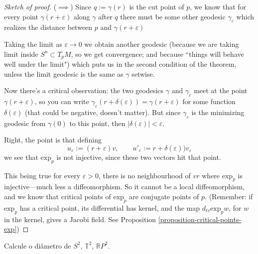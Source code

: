 \begin{proof}[Sketch of proof]
($\implies$) Since $q:=\gamma(r)$ is the cut point of $p$, we know that for every point
$\gamma(r+\varepsilon)$ along $\gamma$ after $q$ there must be some other geodesic
$\gamma_\varepsilon$ which realizes the distance between $p$ and
$\gamma(r+\varepsilon)$

Taking the limit as $\varepsilon \to 0$ we obtain another geodesic
(because we are taking limit inside $S^n \subset T_pM$, so we get convergence;
and because ``things will behave well under the limit")
which puts us in the second condition of the theorem,
unless the limit geodesic is the same as  $\gamma$ setwise.

Now there's a critical observation:
the two geodesics $\gamma$ and $\gamma_\varepsilon$ meet at the point 
 $\gamma(r+\varepsilon)$, so you can write
 $\gamma_\varepsilon(r+\delta(\varepsilon))=\gamma(r+\varepsilon)$
 for some function $\delta(\varepsilon)$ (that could be negative, doesn't
 matter).
 But since $\gamma_\varepsilon$ is the minimizing
 geodesic from $\gamma(0)$ to this point, then
 $|\delta(\varepsilon)|<\varepsilon$.

Right, the point is that defining
$$
u_\varepsilon:=(r+\varepsilon)v,\qquad
u'_\varepsilon:=r+\delta(\varepsilon))v_\varepsilon
$$
we see that $\text{exp}_p$ is not injective, since these two vectors
hit that point.

This being true for every $\varepsilon>0$, there is no neighbourhood of $vr$ 
where $\text{exp}_p$ is injective---much less a diffeomorphism.
So it cannot be a local diffeomorphism, and we know that critical points of
$\text{exp}_p$ are conjugate points of $p$. (Remember: if
$\text{exp}_p$ has a critical point, its differential has kernel,
and the map $d_{tv}\text{exp}_pw$, for $w$ in the kernel, gives 
a Jacobi field. See Proposition \ref{proposition-critical-points-exp})
\end{proof}

\begin{exercise}
\label{exercise-diametros}
Calcule o diâmetro de $S^2$, $\mathbb{T}^2$, $\mathbb{R}P^{2}$.
\end{exercise}

